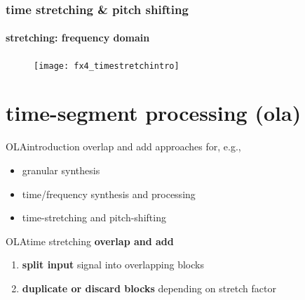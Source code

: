 \begin{frame}\frametitle{time stretching \& pitch shifting}\framesubtitle{stretching: frequency domain}
		\begin{figure}
			\centerline{\texttt{[image: fx4\_timestretchintro]}}
		\end{figure}
\end{frame}
   
    \section[ola]{time-segment processing (ola)}
    \begin{frame}{OLA}{introduction}
        overlap and add approaches for, e.g.,
        
        \begin{itemize}
            \item   granular synthesis
            \item   time/frequency synthesis and processing
            \item   {time-stretching and pitch-shifting}
        \end{itemize}
    \end{frame}

    \begin{frame}{OLA}{time stretching}
            \textbf{overlap and add}
            \begin{enumerate}
                \item	\textbf{split input} signal into overlapping blocks
                \pause
                \item	\textbf{duplicate or discard blocks} depending on stretch factor
            \end{enumerate}
    \end{frame}

